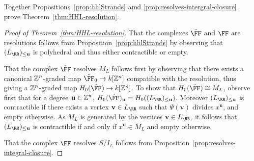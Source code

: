\documentclass{amsart}
\begin{document}
Together Propositions~\ref{prop:hhlStrands} amd \ref{prop:resolves-intergral-closure} prove Theorem~\ref{thm:HHL-resolution}.

\begin{proof}[Proof of Theorem~\ref{thm:HHL-resolution}]
  That the complexes $\tilde \FF$ and $\FF$ are resolutions follows from Proposition~\ref{prop:hhlStrands} by observing that $(L_{\RR})_{\leq \mathbf{u}}$ is polyhedral and thus either contractible or empty.

  That the complex $\tilde \FF$ resolves $M_L$ follows first by observing that there exists a canonical $\mathbb Z^n$-graded map $\tilde \FF_0\rightarrow k[\ZZ^n]$ compatible with the resolution, thus giving a $\mathbb Z^n$-graded map $H_0(\tilde \FF)\rightarrow k[\ZZ^n]$.
  To show that $H_0(\tilde \FF)\cong M_L$, observe first that for a degree $\mathbf{u}\in \mathbb Z^n$,
  $H_0(\tilde \FF)_{\mathbf{u}}=H_0((L_{\RR})_{\leq \mathbf{u}})$. Moreover $(L_{\RR})_{\leq \mathbf{u}}$ is contractible if there exists a vertex $\mathbf{v}\in L_{\RR}$ such that $\Psi(\mathbf{v})$ divides $x^{\mathbf{u}}$, and empty otherwise. As $M_L$ is generated by the vertices $\mathbf{v}\in L_{\RR}$, it follows that $(L_{\RR})_{\leq \mathbf{u}}$ is contractible if and only if $x^{\mathbf{u}}\in M_L$ and empty otherwise.

  That the complex $\FF$ resolves $\overline{S/I_L}$ follows from Proposition~\ref{prop:resolves-integral-closure}.
\end{proof}

\ifdefined\whole
\else


\end{document}
